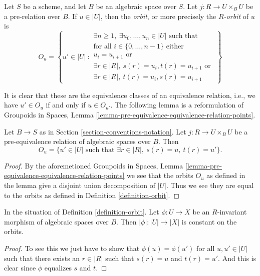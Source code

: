 \begin{definition}
\label{definition-orbit}
Let $S$ be a scheme, and let $B$ be an algebraic space over $S$.
Let $j : R \to U \times_B U$ be a pre-relation over $B$.
If $u \in |U|$, then the {\it orbit}, or more precisely the
{\it $R$-orbit} of $u$ is
$$
O_u =
\left\{
u' \in |U|\ :
\begin{matrix}
\exists n \geq 1,\ \exists u_0, \ldots, u_n \in |U|\text{ such that} \\
\text{for all }i \in \{0, \ldots, n - 1\}\text{ either } \\
u_i = u_{i + 1}\text{ or } \\
\exists r \in |R|,\ s(r) = u_i, t(r) = u_{i + 1}
\text{ or } \\
\exists r \in |R|,\ t(r) = u_i, s(r) = u_{i + 1}
\end{matrix}
\right\}
$$
\end{definition}

\noindent
It is clear that these are the equivalence classes of an equivalence relation,
i.e., we have $u' \in O_u$ if and only if $u \in O_{u'}$. The following lemma
is a reformulation of
Groupoids in Spaces,
Lemma \ref{lemma-pre-equivalence-equivalence-relation-points}.

\begin{lemma}
\label{lemma-pre-equivalence-equivalence-relation-points}
Let $B \to S$ as in Section \ref{section-conventions-notation}.
Let $j : R \to U \times_B U$ be a pre-equivalence relation
of algebraic spaces over $B$. Then
$$
O_u =
\{u' \in |U| \text{ such that } \exists r \in |R|,\ s(r) = u,\ t(r) = u'\}.
$$
\end{lemma}

\begin{proof}
By the aforemetioned
Groupoids in Spaces,
Lemma \ref{lemma-pre-equivalence-equivalence-relation-points}
we see that the orbits $O_u$ as defined in the lemma give a disjoint
union decomposition of $|U|$. Thus we see they are equal to the
orbits as defined in Definition \ref{definition-orbit}.
\end{proof}

\begin{lemma}
\label{lemma-invariant-map-constant-on-orbit}
In the situation of Definition \ref{definition-orbit}.
Let $\phi : U \to X$ be an $R$-invariant morphism of algebraic spaces over
$B$. Then $|\phi| : |U| \to |X|$ is constant on the orbits.
\end{lemma}

\begin{proof}
To see this we just have to show that $\phi(u) = \phi(u')$
for all $u, u' \in |U|$ such that
there exists an $r \in |R|$ such that $s(r) = u$ and $t(r) = u'$.
And this is clear since $\phi$ equalizes $s$ and $t$.
\end{proof}

